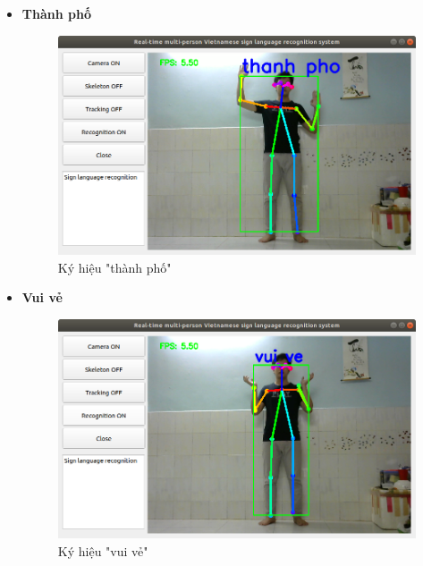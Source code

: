 \documentclass[12pt,a4paper,oneside]{book}
\numberwithin{equation}{chapter} %
\numberwithin{figure}{chapter} %
\numberwithin{table}{chapter} %
\begin{document}
\begin{itemize}
\item \textbf{Thành phố}
\FloatBarrier
\begin{figure}[htp]
\begin{center}
\includegraphics[scale=0.4]{kq/thanh_pho.png}
\end{center}
\caption{Ký hiệu "thành phố"}
\end{figure}
\FloatBarrier

\item \textbf{Vui vẻ}
\FloatBarrier
\begin{figure}[htp]
\begin{center}
\includegraphics[scale=0.4]{kq/vui_ve.png}
\end{center}
\caption{Ký hiệu "vui vẻ"}
\end{figure}
\FloatBarrier

\thispagestyle{phuluc}
\pagebreak


\end{itemize}
\end{document}
